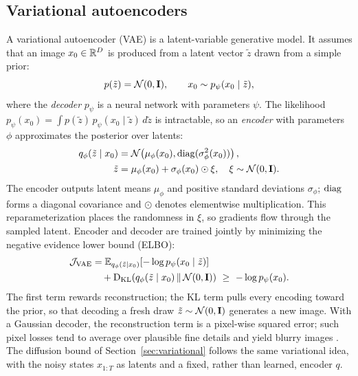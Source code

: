 \subsection{Variational autoencoders}\label{sec:vae-background}
A variational autoencoder (VAE) \cite{kingma2014vae} is a latent-variable
generative model. It assumes that an image $x_0\in\mathbb{R}^D$ is produced from
a latent vector $\tilde z$ drawn from a simple prior:
\begin{equation}
p(\tilde z)=\mathcal{N}(0,\mathbf{I}),\qquad x_0\sim p_\psi(x_0\mid\tilde z),
\label{eq:vaegen}
\end{equation}
where the \emph{decoder} $p_\psi$ is a neural network with parameters
$\psi$. The likelihood
$p_\psi(x_0)=\int p(\tilde z)\,p_\psi(x_0\mid\tilde z)\,d\tilde z$ is
intractable, so an \emph{encoder} with parameters $\phi$ approximates the
posterior over latents:
\begin{align}
q_\phi(\tilde z\mid x_0)
 &=\mathcal{N}\!\left(\mu_\phi(x_0),\operatorname{diag}(\sigma_\phi^2(x_0))\right),\nonumber\\
\tilde z&=\mu_\phi(x_0)+\sigma_\phi(x_0)\odot\xi,\quad
\xi\sim\mathcal{N}(0,\mathbf{I}).\label{eq:vaeenc}
\end{align}
The encoder outputs latent means $\mu_\phi$ and positive standard
deviations $\sigma_\phi$; $\operatorname{diag}$ forms a diagonal covariance and $\odot$
denotes elementwise multiplication. This reparameterization places the
randomness in $\xi$, so gradients flow through the sampled latent.
Encoder and decoder are trained jointly by minimizing the negative
evidence lower bound (ELBO):
\begin{equation}
\begin{aligned}
\mathcal J_{\rm VAE}
&=\mathbb{E}_{q_\phi(\tilde z\mid x_0)}[-\log p_\psi(x_0\mid\tilde z)]\\
&\quad+\operatorname{D_{KL}}\!\left(q_\phi(\tilde z\mid x_0)\,\|\,\mathcal{N}(0,\mathbf{I})\right)
\ \ge\ -\log p_\psi(x_0).
\end{aligned}\label{eq:elbo}
\end{equation}
The first term rewards reconstruction; the KL term pulls every encoding
toward the prior, so that decoding a fresh draw $\tilde z\sim\mathcal{N}(0,\mathbf{I})$
generates a new image. With a Gaussian decoder, the reconstruction term is
a pixel-wise squared error; such pixel losses tend to average over
plausible fine details and yield blurry images \cite[Sec.~3.1]{rombach2022ldm}.
The diffusion bound of Section~\ref{sec:variational} follows the same
variational idea, with the noisy states $x_{1:T}$ as latents and a fixed,
rather than learned, encoder $q$.



